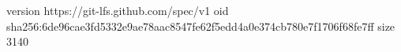 version https://git-lfs.github.com/spec/v1
oid sha256:6de96cae3fd5332e9ae78aac8547fe62f5edd4a0e374cb780e7f1706f68fe7ff
size 3140
